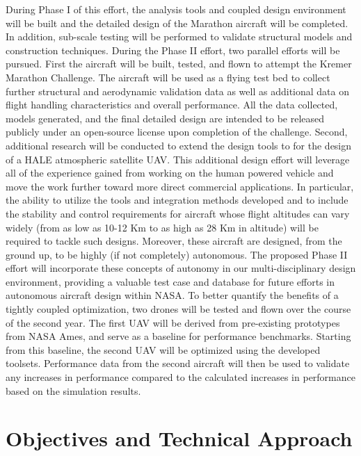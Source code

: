 \documentclass[]{aiaa-tc}
\begin{document}
    During Phase I of this effort, the analysis tools and coupled design environment will be built and 
    the detailed design of the Marathon aircraft will be completed. In addition, sub-scale testing will be 
    performed to validate structural models and construction techniques. During the Phase II effort, two 
    parallel efforts will be pursued. First the aircraft will be built, tested, and flown to attempt the Kremer Marathon Challenge. 
    The aircraft will be used as a flying test bed to collect further structural and aerodynamic validation data as well 
    as additional data on flight handling characteristics and overall performance. All the data collected, 
    models generated, and the final detailed design are intended to be released publicly under an open-source license
    upon completion of the challenge. Second, additional research will be conducted to extend the design tools to 
    for the design of a HALE atmospheric satellite UAV. This additional design effort will leverage all of the experience 
    gained from working on the human powered vehicle and move the work further toward more direct commercial applications.
    In particular, the ability to utilize the tools and integration methods developed and to include the stability and
    control requirements for aircraft whose flight altitudes can vary widely (from as low as 10-12 Km to as high as 28 Km
    in altitude) will be required to tackle such designs.  Moreover, these aircraft are designed, from the ground up, to
    be highly (if not completely) autonomous.  The proposed Phase II effort will incorporate these concepts of autonomy in
    our multi-disciplinary design environment, providing a valuable test case and database for future efforts in
    autonomous aircraft design within NASA. To better quantify the benefits of a tightly coupled optimization,
    two drones will be tested and flown over the course of the second year. The first UAV will be derived from
    pre-existing prototypes from NASA Ames, and serve as a baseline for performance benchmarks.
    Starting from this baseline, the second UAV will be optimized using the developed toolsets.
    Performance data from the second aircraft will then be used to validate any increases in performance compared to
    the calculated increases in performance based on the simulation results.

  \section{Objectives and Technical Approach}
\end{document}
